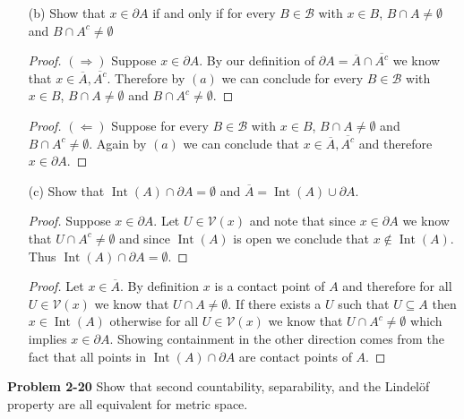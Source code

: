 \documentclass[minion]{homework651}
\def\calB{\mathcal{B}}
\DeclareMathOperator{\Int}{\mathrm{Int}}
\begin{document}
\begin{problems}
\begin{enumerate}
    \item[(b)] Show that $x\in\partial A$ if and only if for every $B\in\calB$  with $x\in B$, $B\cap A\neq\emptyset$
    and $B\cap A^c\neq \emptyset$

    \begin{proof}$(\Rightarrow)$ Suppose $x\in\partial A$. By our definition of $\partial A = \overline{A} \cap \overline{A^c}$ we know that $x \in \overline{A}, \overline{A^c}$. Therefore by $(a)$ we can conclude for every $B\in\calB$  with $x\in B$, $B\cap A\neq\emptyset$ and $B\cap A^c\neq \emptyset$.
    \end{proof}

    \begin{proof}$(\Leftarrow)$ Suppose for every $B\in\calB$ with $x\in B$, $B\cap A\neq\emptyset$ and $B\cap A^c\neq \emptyset$. Again by $(a)$ we can conclude that $x \in \overline{A}, \overline{A^c}$ and therefore $x \in \partial A$. 
    \end{proof}

    \item[(c)] Show that $\Int(A)\cap\partial A = \emptyset$ and $\overline{A}=\Int(A)\cup \partial A$. 
    \begin{proof} Suppose $x \in \partial A$. Let $U \in \mathcal{V}(x)$ and note that since  $x \in \partial A$ we 
        know that $U \cap A^c \neq \emptyset$ and since $\Int(A)$ is open we conclude that $x \not\in \Int(A)$. Thus 
        $\Int(A)\cap\partial A = \emptyset$.
    \end{proof}

    \begin{proof} Let $x \in \overline{A}$. By definition $x$ is a contact point of $A$ and therefore for all 
        $U \in \mathcal{V}(x)$ we know that $U \cap A \neq \emptyset$. If there exists a $U$ such that $U \subseteq A$ then 
        $x \in \Int(A)$ otherwise for all $U \in \mathcal{V}(x)$ we know that $U \cap A^c \neq \emptyset$ which implies $x \in \partial A$. Showing containment in the other direction comes from the fact that all points in $\Int(A) \cap \partial A$ are contact points of $A$.  
    \end{proof}

\end{enumerate}
 


\problem \textbf{Problem 2-20} Show that second countability, separability, and the Lindelöf property are all equivalent for metric space.\\


\end{problems}
\end{document}
